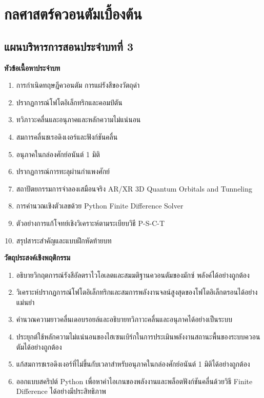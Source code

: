 \chapter{กลศาสตร์ควอนตัมเบื้องต้น}
\label{chap:quantum_mechanics}

\section*{แผนบริหารการสอนประจำบทที่ 3}

\begin{lessonplanbox}
\noindent\textbf{หัวข้อเนื้อหาประจำบท}
\begin{enumerate}
    \item การกำเนิดทฤษฎีควอนตัม การแผ่รังสีของวัตถุดำ
    \item ปรากฏการณ์โฟโตอิเล็กทริกและคอมป์ตัน
    \item ทวิภาวะคลื่นและอนุภาคและหลักความไม่แน่นอน
    \item สมการคลื่นชเรอดิงเงอร์และฟังก์ชันคลื่น
    \item อนุภาคในกล่องศักย์อนันต์ 1 มิติ
    \item ปรากฏการณ์การทะลุผ่านกำแพงศักย์
    \item สถาปัตยกรรมการจำลองเสมือนจริง AR/XR 3D Quantum Orbitals and Tunneling
    \item การคำนวณเชิงตัวเลขด้วย Python Finite Difference Solver
    \item ตัวอย่างการแก้โจทย์เชิงวิเคราะห์ตามระเบียบวิธี P-S-C-T
    \item สรุปสาระสำคัญและแบบฝึกหัดท้ายบท
\end{enumerate}

\vspace{0.4em}
\noindent\textbf{วัตถุประสงค์เชิงพฤติกรรม}
\begin{enumerate}
    \item อธิบายวิกฤตการณ์รังสีอัลตราไวโอเลตและสมมติฐานควอนตัมของมักซ์ พลังค์ได้อย่างถูกต้อง
    \item วิเคราะห์ปรากฏการณ์โฟโตอิเล็กทริกและสมการพลังงานจลน์สูงสุดของโฟโตอิเล็กตรอนได้อย่างแม่นยำ
    \item คำนวณความยาวคลื่นเดอบรอยล์และอธิบายทวิภาวะคลื่นและอนุภาคได้อย่างเป็นระบบ
    \item ประยุกต์ใช้หลักความไม่แน่นอนของไฮเซนเบิร์กในการประเมินพลังงานสถานะพื้นของระบบควอนตัมได้อย่างถูกต้อง
    \item แก้สมการชเรอดิงเงอร์ที่ไม่ขึ้นกับเวลาสำหรับอนุภาคในกล่องศักย์อนันต์ 1 มิติได้อย่างถูกต้อง
    \item ออกแบบสคริปต์ Python เพื่อหาค่าไอเกนของพลังงานและพล็อตฟังก์ชันคลื่นด้วยวิธี Finite Difference ได้อย่างมีประสิทธิภาพ
\end{enumerate}


\end{lessonplanbox}
